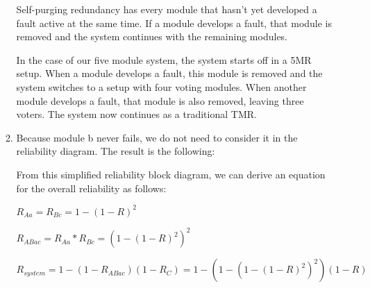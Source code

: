 \documentclass[a4paper,12pt]{article}
\begin{document}
\begin{enumerate}
\begin{enumerate}
                    Self-purging redundancy has every module that hasn't yet developed a fault active at the same time. If a module develops a fault, that module is removed and the system continues with the remaining modules.

                    In the case of our five module system, the system starts off in a 5MR setup. When a module develops a fault, this module is removed and the system switches to a setup with four voting modules. When another module develops a fault, that module is also removed, leaving three voters. The system now continues as a traditional TMR.

                \item Because module b never fails, we do not need to consider it in the reliability diagram. The result is the following:


                    From this simplified reliability block diagram, we can derive an equation for the overall reliability as follows:

                    $R_{Aa} = R_{Bc} = 1 - (1 - R)^2$

                    $R_{ABac} = R_{Aa} * R_{Bc} = (1 - (1 - R)^2)^2$

                    $R_{system} = 1 - (1 - R_{ABac})(1 - R_C) = 1 - (1 - (1 - (1 - R)^2)^2)(1 - R) $


\end{enumerate}
\end{enumerate}
\end{document}
